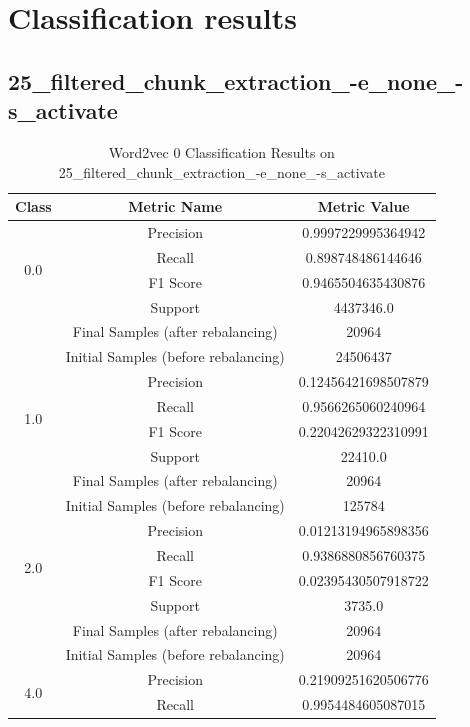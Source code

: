 \section{Classification results}

\label{sec:annexe:classification_results}

\subsection{25\_filtered\_chunk\_extraction\_-e\_none\_-s\_activate}

\begin{longtable}{|c|c|c|}
\caption{Word2vec 0 Classification Results on 25\_filtered\_chunk\_extraction\_-e\_none\_-s\_activate} \label{tab:25_filtered_chunk_extraction_-e_none_-s_activate_word2vec_0_classifiers_results} \\
\hline
Class & Metric Name & Metric Value \\
\hline
\multirow{4}{*}{0.0} & Precision & 0.9997229995364942 \\
 & Recall & 0.898748486144646 \\
 & F1 Score & 0.9465504635430876 \\
 & Support & 4437346.0 \\
 & Final Samples (after rebalancing) & 20964 \\
 & Initial Samples (before rebalancing) & 24506437 \\
\hline
\multirow{4}{*}{1.0} & Precision & 0.12456421698507879 \\
 & Recall & 0.9566265060240964 \\
 & F1 Score & 0.22042629322310991 \\
 & Support & 22410.0 \\
 & Final Samples (after rebalancing) & 20964 \\
 & Initial Samples (before rebalancing) & 125784 \\
\hline
\multirow{4}{*}{2.0} & Precision & 0.01213194965898356 \\
 & Recall & 0.9386880856760375 \\
 & F1 Score & 0.02395430507918722 \\
 & Support & 3735.0 \\
 & Final Samples (after rebalancing) & 20964 \\
 & Initial Samples (before rebalancing) & 20964 \\
\hline
\multirow{4}{*}{4.0} & Precision & 0.21909251620506776 \\
 & Recall & 0.9954484605087015 \\

\end{longtable}
